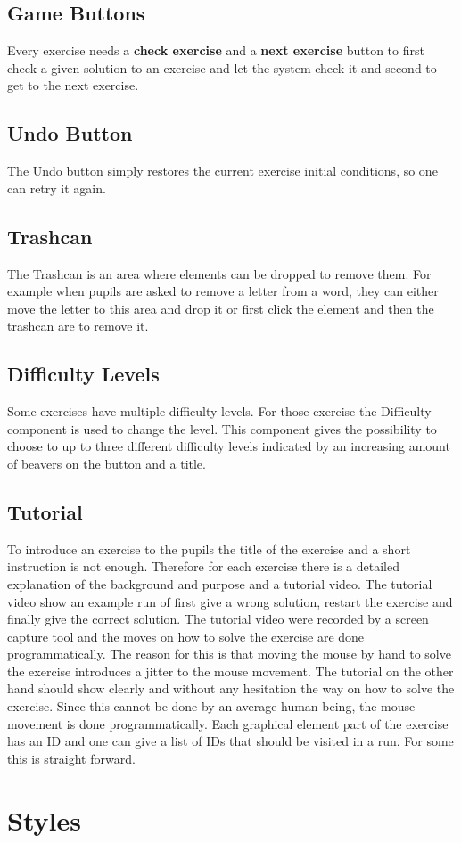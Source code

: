 \subsection*{Game Buttons}
Every exercise needs a \textbf{check exercise} and a \textbf{next exercise} button to first check a given solution to an exercise and let the system check it and second to get to the next exercise.

\subsection*{Undo Button}
The Undo button simply restores the current exercise initial conditions, so one can retry it again.

\subsection*{Trashcan}
The Trashcan is an area where elements can be dropped to remove them. For example when pupils are asked to remove a letter from a word, they can either move the letter to this area and drop it or first click the element and then the trashcan are to remove it.

\subsection*{Difficulty Levels}
Some exercises have multiple difficulty levels. For those exercise the Difficulty component is used to change the level. This component gives the possibility to choose to up to three different difficulty levels indicated by an increasing amount of beavers on the button and a title.

\subsection*{Tutorial}
To introduce an exercise to the pupils the title of the exercise and a short instruction is not enough. Therefore for each exercise there is a detailed explanation of the background and purpose and a tutorial video. The tutorial video show an example run of first give a wrong solution, restart the exercise and finally give the correct solution.
The tutorial video were recorded by a screen capture tool and the moves on how to solve the exercise are done programmatically. The reason for this is that moving the mouse by hand to solve the exercise introduces a jitter to the mouse movement. The tutorial on the other hand should show clearly and without any hesitation the way on how to solve the exercise. Since this cannot be done by an average human being, the mouse movement is done programmatically. Each graphical element part of the exercise has an ID and one can give a list of IDs that should be visited in a run. For some this is straight forward.

\section{Styles}
\label{section:styles}
\TODO{}